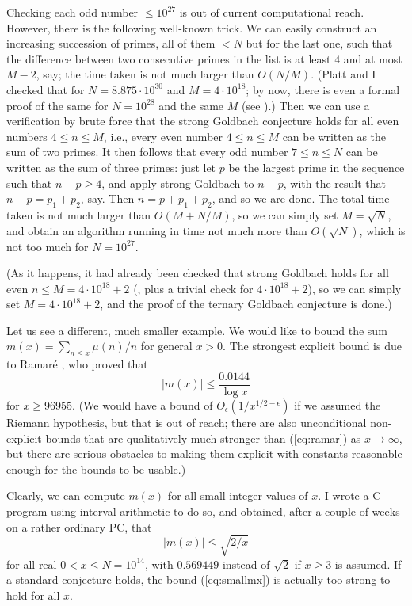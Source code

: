   Checking each odd number $\leq 10^{27}$ is out of current computational reach.
  However, there is the following well-known trick. We can easily construct
  an increasing succession of primes, all of them $<N$ but for the last
  one, such that the difference between two consecutive primes in the list
  is at least $4$ and at
  most $M-2$, say; the time taken is not much larger than $O(N/M)$.
  (Platt and I checked that for $N = 8.875\cdot 10^{30}$ and
  $M = 4\cdot 10^{18}$; by now, there is even a formal proof of the same
  for $N=10^{28}$ and the same $M$ (see \cite{ThGr}).) Then we can use a
  verification by brute force
  that the strong Goldbach conjecture holds for all even
  numbers $4\leq n\leq M$, i.e., every even number $4\leq n\leq M$ can be
  written as the sum of two primes. It then follows that every odd number
  $7\leq n\leq N$ can be written as the sum of three primes: just let $p$
  be the largest prime in the sequence such that $n-p\geq 4$, and apply
  strong Goldbach to $n-p$, with the result that $n-p=p_1 + p_2$, say.
  Then $n = p + p_1 + p_2$, and so we are done. The total time taken is
  not much larger than $O(M+N/M)$, so we can simply set $M=\sqrt{N}$,
  and obtain an algorithm running in time not much more than $O(\sqrt{N})$,
  which is not too much for $N=10^{27}$.
  
  (As it happens, it had already been checked that strong Goldbach holds for
  all even $n\leq M = 4\cdot 10^{18}+2$ (\cite{e2014empirical},
  plus a trivial check for
  $4\cdot 10^{18}+2$), so we can simply set $M=4\cdot 10^{18}+2$, and the proof
  of the ternary Goldbach conjecture is done.)

  Let us see a different, much smaller example. We would like to bound
  the sum $m(x) =\sum_{n\leq x} \mu(n)/n$ for general $x>0$. The strongest
  explicit bound is due to Ramar\'e \cite{ramare2015explicit}, who proved that
  \begin{equation}\label{eq:ramar}
    |m(x)|\leq \frac{0.0144}{\log x}\end{equation}
  for $x\geq 96955$. (We would have a bound of $O_\epsilon(1/x^{1/2-\epsilon})$ if
  we assumed the Riemann hypothesis, but that is out of reach; there
  are also unconditional non-explicit bounds that are qualitatively
  much stronger than (\ref{eq:ramar}) as $x\to \infty$, but there are
  serious obstacles to making them explicit with constants reasonable enough
  for the bounds to be usable.)

  Clearly, we can compute $m(x)$ for all small integer values of $x$.
  I wrote a C program using interval arithmetic to do so, and obtained, after
  a couple of weeks on a rather ordinary PC, that
  \begin{equation}\label{eq:smallmx}
    |m(x)|\leq \sqrt{2/x}
  \end{equation}
  for all real $0<x\leq N = 10^{14}$, with $0.569449$ instead of $\sqrt{2}$ if
  $x\geq 3$ is assumed. If a standard conjecture holds, the bound
  (\ref{eq:smallmx}) is actually too strong to hold for all $x$.

